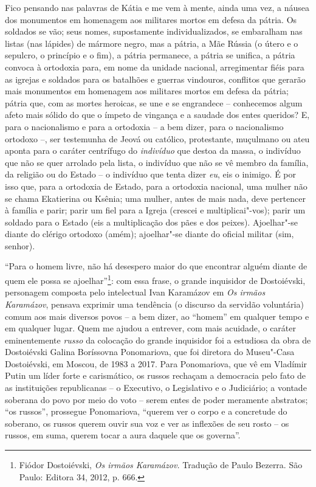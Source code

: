 Fico pensando nas palavras de Kátia e me vem à mente, ainda uma vez, a
náusea dos monumentos em homenagem aos militares mortos em defesa da
pátria. Os soldados se vão; seus nomes, supostamente individualizados,
se embaralham nas listas (nas lápides) de mármore negro, mas a pátria, a
Mãe Rússia (o útero e o sepulcro, o princípio e o fim), a pátria
permanece, a pátria se unifica, a pátria convoca à ortodoxia para, em
nome da unidade nacional, arregimentar fiéis para as igrejas e soldados
para os batalhões e guerras vindouros, conflitos que gerarão mais
monumentos em homenagem aos militares mortos em defesa da pátria; pátria
que, com as mortes heroicas, se une e se engrandece -- conhecemos algum
afeto mais sólido do que o ímpeto de vingança e a saudade dos entes
queridos? E, para o nacionalismo e para a ortodoxia -- a bem dizer, para
o nacionalismo ortodoxo --, ser testemunha de Jeová ou católico,
protestante, muçulmano ou ateu aponta para o caráter centrífugo do
\emph{indivíduo} que destoa da massa, o indivíduo que não se quer
arrolado pela lista, o indivíduo que não se vê membro da família, da
religião ou do Estado -- o indivíduo que tenta dizer \emph{eu}, eis o
inimigo. É por isso que, para a ortodoxia de Estado, para a ortodoxia
nacional, uma mulher não se chama Ekatierina ou Ksênia; uma mulher,
antes de mais nada, deve pertencer à família e parir; parir um fiel para
a Igreja (crescei e multiplicai"-vos); parir um soldado para o Estado
(eis a multiplicação dos pães e dos peixes). Ajoelhar"-se diante do
clérigo ortodoxo (amém); ajoelhar"-se diante do oficial militar (sim,
senhor).

``Para o homem livre, não há desespero maior do que encontrar alguém
diante de quem ele possa se ajoelhar''\footnote{Fiódor Dostoiévski,
  \emph{Os irmãos Karamázov.} Tradução de Paulo Bezerra. São Paulo:
  Editora 34, 2012, p. 666.}: com essa frase, o grande inquisidor de
Dostoiévski, personagem composta pelo intelectual Ivan Karamázov em
\emph{Os irmãos Karamázov}, pensava exprimir uma tendência (o discurso
da servidão voluntária) comum aos mais diversos povos -- a bem dizer, ao
``homem'' em qualquer tempo e em qualquer lugar. Quem me ajudou a
entrever, com mais acuidade, o caráter eminentemente \emph{russo} da
colocação do grande inquisidor foi a estudiosa da obra de Dostoiévski
Galina Boríssovna Ponomariova, que foi diretora do Museu"-Casa
Dostoiévski, em Moscou, de 1983 a 2017. Para Ponomariova, que vê em
Vladímir Putin um líder forte e carismático, os russos rechaçam a
democracia pelo fato de as instituições republicanas -- o Executivo, o
Legislativo e o Judiciário; a vontade soberana do povo por meio do voto
-- serem entes de poder meramente abstratos; ``os russos'', prossegue
Ponomariova, ``querem ver o corpo e a concretude do soberano, os russos
querem ouvir sua voz e ver as inflexões de seu rosto -- os russos, em
suma, querem tocar a aura daquele que os governa''.

